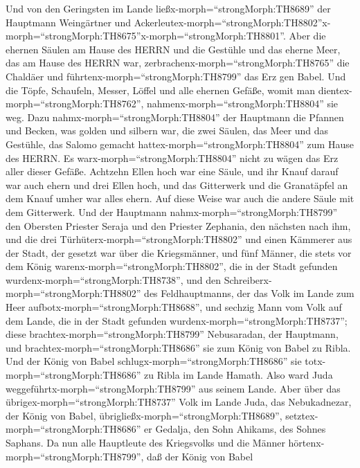  Und von den Geringsten im Lande
ließx-morph=``strongMorph:TH8689'' der Hauptmann Weingärtner und
Ackerleutex-morph=``strongMorph:TH8802''\textbar x-morph=``strongMorph:TH8675''x-morph=``strongMorph:TH8801''.
 Aber die ehernen Säulen am Hause des HERRN und die
Gestühle und das eherne Meer, das am Hause des HERRN war,
zerbrachenx-morph=``strongMorph:TH8765'' die Chaldäer und
führtenx-morph=``strongMorph:TH8799'' das Erz gen Babel. 
Und die Töpfe, Schaufeln, Messer, Löffel und alle ehernen Gefäße, womit
man dientex-morph=``strongMorph:TH8762'',
nahmenx-morph=``strongMorph:TH8804'' sie weg.  Dazu
nahmx-morph=``strongMorph:TH8804'' der Hauptmann die Pfannen und Becken,
was golden und silbern war,  die zwei Säulen, das Meer und
das Gestühle, das Salomo gemacht hattex-morph=``strongMorph:TH8804'' zum
Hause des HERRN. Es warx-morph=``strongMorph:TH8804'' nicht zu wägen das
Erz aller dieser Gefäße.  Achtzehn Ellen hoch war eine
Säule, und ihr Knauf darauf war auch ehern und drei Ellen hoch, und das
Gitterwerk und die Granatäpfel an dem Knauf umher war alles ehern. Auf
diese Weise war auch die andere Säule mit dem Gitterwerk. 
Und der Hauptmann nahmx-morph=``strongMorph:TH8799'' den Obersten
Priester Seraja und den Priester Zephania, den nächsten nach ihm, und
die drei Türhüterx-morph=``strongMorph:TH8802''  und einen
Kämmerer aus der Stadt, der gesetzt war über die Kriegsmänner, und fünf
Männer, die stets vor dem König warenx-morph=``strongMorph:TH8802'', die
in der Stadt gefunden wurdenx-morph=``strongMorph:TH8738'', und den
Schreiberx-morph=``strongMorph:TH8802'' des Feldhauptmanns, der das Volk
im Lande zum Heer aufbotx-morph=``strongMorph:TH8688'', und sechzig Mann
vom Volk auf dem Lande, die in der Stadt gefunden
wurdenx-morph=``strongMorph:TH8737'';  diese
brachtex-morph=``strongMorph:TH8799'' Nebusaradan, der Hauptmann, und
brachtex-morph=``strongMorph:TH8686'' sie zum König von Babel zu Ribla.
 Und der König von Babel
schlugx-morph=``strongMorph:TH8686'' sie
totx-morph=``strongMorph:TH8686'' zu Ribla im Lande Hamath. Also ward
Juda weggeführtx-morph=``strongMorph:TH8799'' aus seinem Lande.
 Aber über das übrigex-morph=``strongMorph:TH8737'' Volk im
Lande Juda, das Nebukadnezar, der König von Babel,
übrigließx-morph=``strongMorph:TH8689'',
setztex-morph=``strongMorph:TH8686'' er Gedalja, den Sohn Ahikams, des
Sohnes Saphans.  Da nun alle Hauptleute des Kriegsvolks und
die Männer hörtenx-morph=``strongMorph:TH8799'', daß der König von Babel
